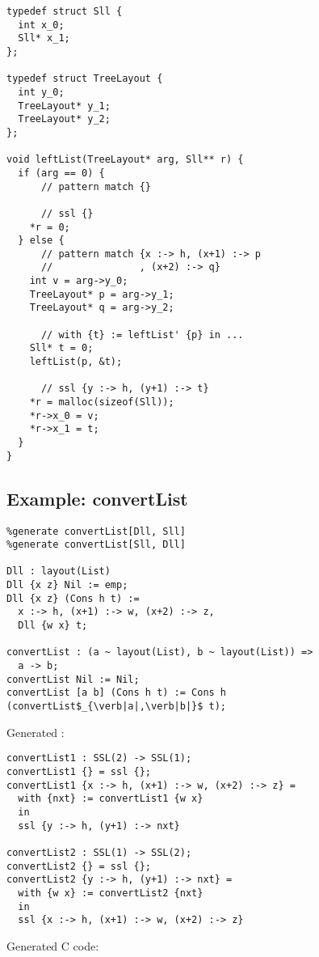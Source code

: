 \begin{lstlisting}
typedef struct Sll {
  int x_0;
  Sll* x_1;
};

typedef struct TreeLayout {
  int y_0;
  TreeLayout* y_1;
  TreeLayout* y_2;
};

void leftList(TreeLayout* arg, Sll** r) {
  if (arg == 0) {
      // pattern match {}

      // ssl {}
    *r = 0;
  } else {
      // pattern match {x :-> h, (x+1) :-> p
      //               , (x+2) :-> q}
    int v = arg->y_0;
    TreeLayout* p = arg->y_1;
    TreeLayout* q = arg->y_2;

      // with {t} := leftList' {p} in ...
    Sll* t = 0;
    leftList(p, &t);

      // ssl {y :-> h, (y+1) :-> t}
    *r = malloc(sizeof(Sll));
    *r->x_0 = v;
    *r->x_1 = t;
  }
}
\end{lstlisting}


\subsection{Example: convertList}

\begin{lstlisting}
%generate convertList[Dll, Sll]
%generate convertList[Sll, Dll]

Dll : layout(List)
Dll {x z} Nil := emp;
Dll {x z} (Cons h t) :=
  x :-> h, (x+1) :-> w, (x+2) :-> z,
  Dll {w x} t;

convertList : (a ~ layout(List), b ~ layout(List)) =>
  a -> b;
convertList Nil := Nil;
convertList [a b] (Cons h t) := Cons h (convertList$_{\verb|a|,\verb|b|}$ t);
\end{lstlisting}

Generated \PikaCore:

\begin{lstlisting}
convertList1 : SSL(2) -> SSL(1);
convertList1 {} = ssl {};
convertList1 {x :-> h, (x+1) :-> w, (x+2) :-> z} =
  with {nxt} := convertList1 {w x}
  in
  ssl {y :-> h, (y+1) :-> nxt}

convertList2 : SSL(1) -> SSL(2);
convertList2 {} = ssl {};
convertList2 {y :-> h, (y+1) :-> nxt} =
  with {w x} := convertList2 {nxt}
  in
  ssl {x :-> h, (x+1) :-> w, (x+2) :-> z}
\end{lstlisting}

Generated C code:

